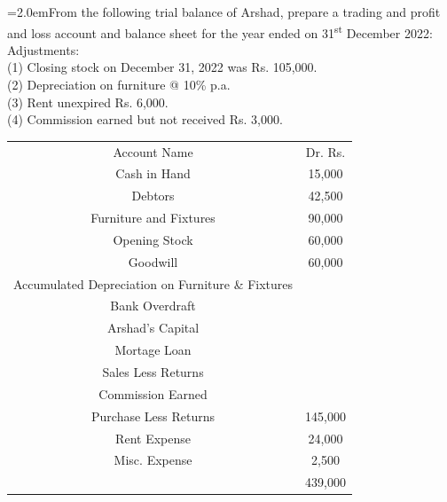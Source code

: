\documentclass[11pt,a4paper]{article}
\newcommand{\lqn}[2]{\Needspace{6\baselineskip}\par\medskip\noindent\hangindent=2.0em\hangafter=1\makebox[2.0em][l]{\textbf{#1.}}#2\par}
\begin{document}
\lqn{100}{From the following trial balance of Arshad, prepare a trading and profit and loss account and balance sheet for the year ended on 31\textsuperscript{st} December 2022:\\
Adjustments:\\
(1) Closing stock on December 31, 2022 was Rs. 105,000.\\
(2) Depreciation on furniture @ 10\% p.a.\\
(3) Rent unexpired Rs. 6,000.\\
(4) Commission earned but not received Rs. 3,000.\par
\par\smallskip\noindent\hspace*{1.2em}\begin{tabular}{|cc|}
\hline
Account Name & Dr. Rs. \\
Cash in Hand & 15,000 \\
Debtors & 42,500 \\
Furniture and Fixtures & 90,000 \\
Opening Stock & 60,000 \\
Goodwill & 60,000 \\
Accumulated Depreciation on Furniture \& Fixtures &  \\
Bank Overdraft &  \\
Arshad's Capital &  \\
Mortage Loan &  \\
Sales Less Returns &  \\
Commission Earned &  \\
Purchase Less Returns & 145,000 \\
Rent Expense & 24,000 \\
Misc. Expense & 2,500 \\
 & 439,000 \\
\hline
\end{tabular}\par\smallskip
}
\end{document}
